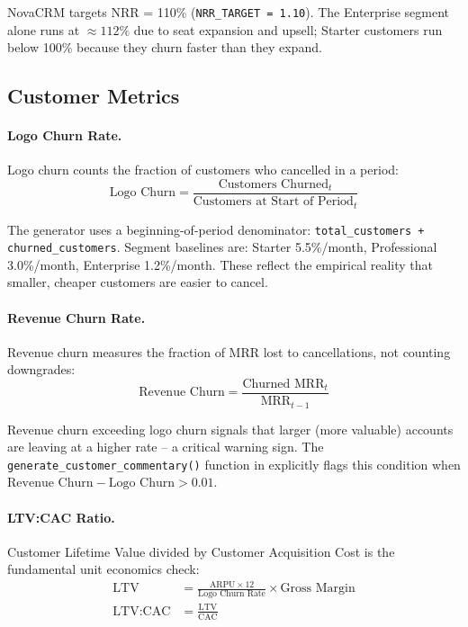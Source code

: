 NovaCRM targets NRR = 110\% (\texttt{NRR\_TARGET = 1.10}). The Enterprise segment alone runs at \(\approx 112\%\) due to seat expansion and upsell; Starter customers run below 100\% because they churn faster than they expand.

\subsection{Customer Metrics}

\paragraph{Logo Churn Rate.}
Logo churn counts the fraction of customers who cancelled in a period:
\begin{equation}
  \text{Logo Churn} = \frac{\text{Customers Churned}_{t}}{\text{Customers at Start of Period}_{t}}
\end{equation}

The generator uses a beginning-of-period denominator: \texttt{total\_customers + churned\_customers}. Segment baselines are: Starter 5.5\%/month, Professional 3.0\%/month, Enterprise 1.2\%/month. These reflect the empirical reality that smaller, cheaper customers are easier to cancel.

\paragraph{Revenue Churn Rate.}
Revenue churn measures the fraction of MRR lost to cancellations, not counting downgrades:
\begin{equation}
  \text{Revenue Churn} = \frac{\text{Churned MRR}_{t}}{\text{MRR}_{t-1}}
\end{equation}

Revenue churn exceeding logo churn signals that larger (more valuable) accounts are leaving at a higher rate -- a critical warning sign. The \texttt{generate\_customer\_commentary()} function in  explicitly flags this condition when \(\text{Revenue Churn} - \text{Logo Churn} > 0.01\).

\paragraph{LTV:CAC Ratio.}
Customer Lifetime Value divided by Customer Acquisition Cost is the fundamental unit economics check:
\begin{align}
  \text{LTV} &= \frac{\text{ARPU} \times 12}{\text{Logo Churn Rate}} \times \text{Gross Margin} \\
  \text{LTV:CAC} &= \frac{\text{LTV}}{\text{CAC}}
\end{align}

